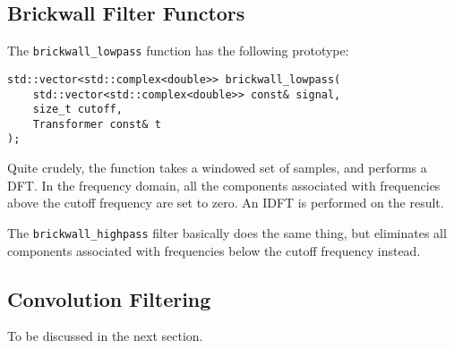 \subsection{Brickwall Filter Functors}
The \verb|brickwall_lowpass| function has the following prototype:

\begin{verbatim}
std::vector<std::complex<double>> brickwall_lowpass(
    std::vector<std::complex<double>> const& signal,
    size_t cutoff,
    Transformer const& t
);
\end{verbatim}

Quite crudely, the function takes a windowed set of samples, and performs a DFT.
In the frequency domain, all the components associated with frequencies above 
the cutoff frequency are set to zero.
An IDFT is performed on the result.

The \verb|brickwall_highpass| filter basically does the same thing, 
but eliminates all components associated with frequencies below the cutoff frequency instead.

\subsection{Convolution Filtering}
To be discussed in the next section.